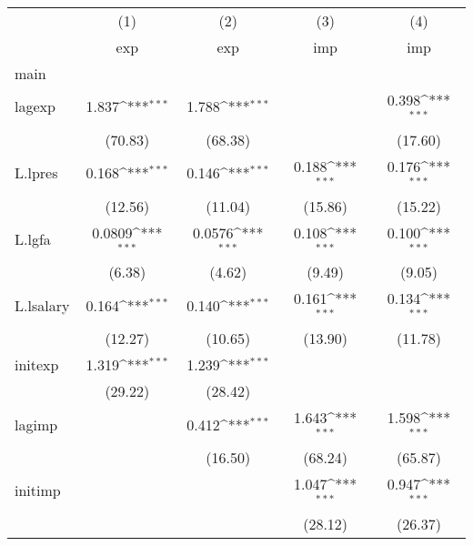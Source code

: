 {
\def\sym#1{\ifmmode^{#1}\else\(^{#1}\)\fi}
\begin{tabular}{l*{4}{c}}
\hline\hline
            &\multicolumn{1}{c}{(1)}&\multicolumn{1}{c}{(2)}&\multicolumn{1}{c}{(3)}&\multicolumn{1}{c}{(4)}\\
            &\multicolumn{1}{c}{exp}&\multicolumn{1}{c}{exp}&\multicolumn{1}{c}{imp}&\multicolumn{1}{c}{imp}\\
\hline
main        &                     &                     &                     &                     \\
lagexp      &       1.837\sym{***}&       1.788\sym{***}&                     &       0.398\sym{***}\\
            &     (70.83)         &     (68.38)         &                     &     (17.60)         \\
[1em]
L.lpres     &       0.168\sym{***}&       0.146\sym{***}&       0.188\sym{***}&       0.176\sym{***}\\
            &     (12.56)         &     (11.04)         &     (15.86)         &     (15.22)         \\
[1em]
L.lgfa      &      0.0809\sym{***}&      0.0576\sym{***}&       0.108\sym{***}&       0.100\sym{***}\\
            &      (6.38)         &      (4.62)         &      (9.49)         &      (9.05)         \\
[1em]
L.lsalary   &       0.164\sym{***}&       0.140\sym{***}&       0.161\sym{***}&       0.134\sym{***}\\
            &     (12.27)         &     (10.65)         &     (13.90)         &     (11.78)         \\
[1em]
initexp     &       1.319\sym{***}&       1.239\sym{***}&                     &                     \\
            &     (29.22)         &     (28.42)         &                     &                     \\
[1em]
lagimp      &                     &       0.412\sym{***}&       1.643\sym{***}&       1.598\sym{***}\\
            &                     &     (16.50)         &     (68.24)         &     (65.87)         \\
[1em]
initimp     &                     &                     &       1.047\sym{***}&       0.947\sym{***}\\
            &                     &                     &     (28.12)         &     (26.37)         \\

\end{tabular}}
